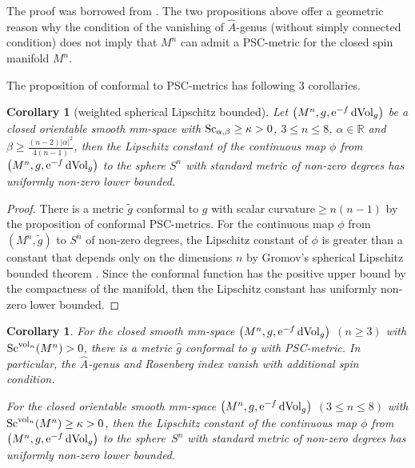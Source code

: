 \documentclass[10pt,a4paper]{amsart}
\newtheorem{Corollary}[Theorem]{Corollary}
\begin{document}
\begin{Remark}
 The proof was borrowed from \cite[Proposition~2]{MR3625165}. The two propositions above offer a geometric reason why the condition of the vanishing of $\widehat{A}$-genus (without simply connected condition) does not imply that $M^n$ can admit a PSC-metric for the closed spin manifold $M^n$.
\end{Remark}

The proposition of conformal to PSC-metrics has following 3 corollaries.

\begin{Corollary}[weighted spherical Lipschitz bounded]
Let $\big(M^n, g, {\rm e}^{-f}\,{\rm dVol}_g\big)$ be a closed orientable smooth mm-space with ${\rm Sc}_{\alpha, \beta}\geq \kappa >0$, $3\leq n\leq 8$, $\alpha \in \mathbb{R}$ and $\beta \geq \frac{(n-2)|\alpha|^2}{4(n-1)}$, then the Lipschitz constant of the continuous map $\phi$ from $\big(M^n, g, {\rm e}^{-f}\,{\rm dVol}_g\big)$ to the sphere $S^n$ with standard metric of non-zero degrees has uniformly non-zero lower bounded.
\end{Corollary}

\begin{proof}There is a metric $\tilde{g}$ conformal to $g$ with scalar curvature${}\geq n(n-1)$ by the proposition of conformal PSC-metrics. For the continuous map $\phi$ from $(M^n, \tilde{g})$ to $S^n$ of non-zero degrees, the Lipschitz constant of $\phi$ is greater than a constant that depends only on the dimensions $n$ by Gromov's spherical Lipschitz bounded theorem \cite[Section~3]{MR3816521}. Since the conformal function has the positive upper bound by the compactness of the manifold, then the Lipschitz constant has uniformly non-zero lower bounded.
\end{proof}

\begin{Corollary}\label{weighted volume}
For the closed smooth mm-space $\big(M^n, g, {\rm e}^{-f}\,{\rm dVol}_g\big)$ $(n\geq 3)$ with ${\rm Sc}^{{\rm vol}_n}(M^n) \allowbreak >0$, there is a metric $\hat{g}$ conformal to $g$ with PSC-metric. In particular, the $\widehat{A}$-genus and Rosenberg index vanish with additional spin condition.

For the closed orientable smooth mm-space $\big(M^n, g, {\rm e}^{-f}\,{\rm dVol}_g\big)$ $(3\leq n\leq 8)$ with ${\rm Sc}^{{\rm vol}_n}(M^n)\geq \kappa >0$, then the Lipschitz constant of the continuous map $\phi$ from $\big(M^n, g, {\rm e}^{-f}\,{\rm dVol}_g\big)$ to the sphere~$S^n$ with standard metric of non-zero degrees has uniformly non-zero lower bounded.
\end{Corollary}
\end{document}
